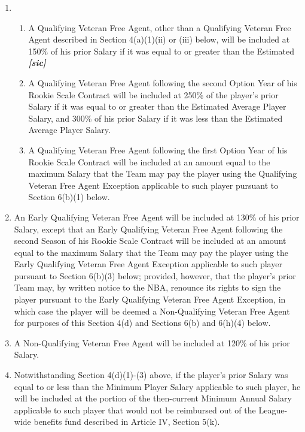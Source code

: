 \documentclass[
]{book}
\providecommand{\tightlist}{%
  \setlength{\itemsep}{0pt}\setlength{\parskip}{0pt}}
\begin{document}
\begin{enumerate}
  \begin{enumerate}
  \def\labelenumii{(\arabic{enumii})}
  \item
    \begin{enumerate}
    \def\labelenumiii{(\roman{enumiii})}
    \tightlist
    \item
      A Qualifying Veteran Free Agent, other than a Qualifying Veteran Free Agent described in Section 4(a)(1)(ii) or (iii) below, will be included at 150\% of his prior Salary if it was equal to or greater than the Estimated \textbf{\emph{{[}sic{]}}}
    \item
      A Qualifying Veteran Free Agent following the second Option Year of his Rookie Scale Contract will be included at 250\% of the player's prior Salary if it was equal to or greater than the Estimated Average Player Salary, and 300\% of his prior Salary if it was less than the Estimated Average Player Salary.
    \item
      A Qualifying Veteran Free Agent following the first Option Year of his Rookie Scale Contract will be included at an amount equal to the maximum Salary that the Team may pay the player using the Qualifying Veteran Free Agent Exception applicable to such player pursuant to Section 6(b)(1) below.
    \end{enumerate}
  \item
    An Early Qualifying Veteran Free Agent will be included at 130\% of his prior Salary, except that an Early Qualifying Veteran Free Agent following the second Season of his Rookie Scale Contract will be included at an amount equal to the maximum Salary that the Team may pay the player using the Early Qualifying Veteran Free Agent Exception applicable to such player pursuant to Section 6(b)(3) below; provided, however, that the player's prior Team may, by written notice to the NBA, renounce its rights to sign the player pursuant to the Early Qualifying Veteran Free Agent Exception, in which case the player will be deemed a Non-Qualifying Veteran Free Agent for purposes of this Section 4(d) and Sections 6(b) and 6(h)(4) below.
  \item
    A Non-Qualifying Veteran Free Agent will be included at 120\% of his prior Salary.
  \item
    Notwithstanding Section 4(d)(1)-(3) above, if the player's prior Salary was equal to or less than the Minimum Player Salary applicable to such player, he will be included at the portion of the then-current Minimum Annual Salary applicable to such player that would not be reimbursed out of the League-wide benefits fund described in Article IV, Section 5(k).

\end{enumerate}
\end{enumerate}
\end{document}
